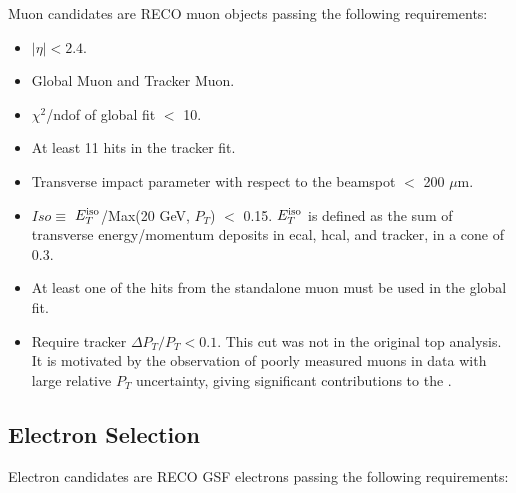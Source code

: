 Muon candidates are RECO muon objects passing the following
requirements:
\begin{itemize}

\item $|\eta| < 2.4$.

\item Global Muon and Tracker Muon.

\item $\chi^2$/ndof of global fit $<$ 10.

\item At least 11 hits in the tracker fit.

\item Transverse impact parameter with respect to the beamspot $<$ 200 $\mu$m.

\item $Iso \equiv $ $E_T^{\rm iso}$/Max(20 GeV, $P_T$) $<$ 0.15.  
$E_T^{\rm iso}$
is defined as the sum of transverse energy/momentum deposits in ecal,
hcal, and tracker, in a cone of 0.3.

\item At least one of the hits from the 
standalone muon must be used in the global fit.

\item Require tracker $\Delta P_T/P_T < 0.1$. This cut was not in the original top analysis.
It is motivated by the observation of
poorly measured muons in data with large
relative $P_T$ uncertainty, giving significant contributions to the \met.


\end{itemize}



\subsection{Electron Selection}
\label{sec:electron}

Electron candidates are RECO GSF electrons passing the following
requirements:

